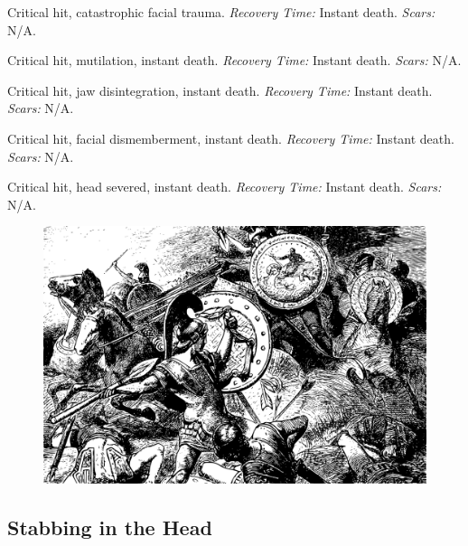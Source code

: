 \documentclass[12pt]{book}  %
\begin{document}
\begin{description}[labelwidth=1.5em, leftmargin=*, itemsep=0.4em]
    \item[16 -] Critical hit, catastrophic facial trauma. \textit{Recovery Time:} Instant death. \textit{Scars:} N/A.
    \item[17 -] Critical hit, mutilation, instant death. \textit{Recovery Time:} Instant death. \textit{Scars:} N/A.
    \item[18 -] Critical hit, jaw disintegration, instant death. \textit{Recovery Time:} Instant death. \textit{Scars:} N/A.
    \item[19 -] Critical hit, facial dismemberment, instant death. \textit{Recovery Time:} Instant death. \textit{Scars:} N/A.
    \item[20 -] Critical hit, head severed, instant death. \textit{Recovery Time:} Instant death. \textit{Scars:} N/A.
\end{description}

\begin{figure}[h]
    \centering
    \includegraphics[width=\textwidth]{./images/combat09.pdf}
\end{figure}

\subsection{Stabbing in the Head}
\end{document}
